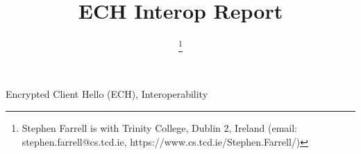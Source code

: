 \documentclass[10pt,final,journal,twoside,pdftex]{IEEEtran}
\begin{document}
\title{
		ECH Interop Report
}


\author{
\thanks{
Stephen Farrell is with Trinity College, Dublin 2, Ireland (email: stephen.farrell@cs.tcd.ie, https://www.cs.tcd.ie/Stephen.Farrell/)
}

}





\maketitle



\begin{IEEEkeywords}
Encrypted Client Hello (ECH), Interoperability
\end{IEEEkeywords}






\end{document}
